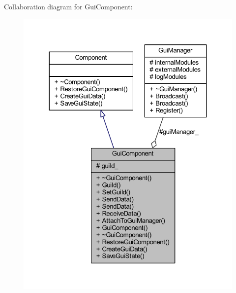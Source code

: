 Collaboration diagram for Gui\+Component\+:
\nopagebreak
\begin{figure}[H]
\begin{center}
\leavevmode
\includegraphics[width=324pt]{class_gui_component__coll__graph}
\end{center}
\end{figure}
